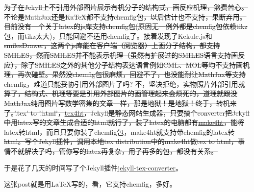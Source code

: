 \documentclass{article}
\begin{document}
\sout{为了在Jekyll上不引用外部图片展示有机分子的结构式，画反应机理，煞费苦心。不论是MathJax还是KaTeX都不支持chemfig包，以后估计也不支持，果断弃用。目前没有一个关于latex的js库支持chemfig包(原因无一例外都是chemfig包依赖tikz包，而tikz太大)，只能回避不适用chemfig了。接着发现了Kekule.js和smilesDrawer，这两个js库能在客户端（阅览器）上画分子结构，都支持SMILES，然而SMILES并不能表示机理（虽然有扩展过的SMILES语言支持画反应），除了SMILES之外的其他分子结构表达语言例如CML、MOL等均不支持画机理，再次碰壁。果然没chemfig包很麻烦，回避不了，也没能耐让MathJax等支持chemfig，难道只能妥协引用外部图片了吗? 不，坚决拒绝，实物照片外部引用就算了，结构式、机理等要是引用外部图片的画管理起来会烦死的，道理就跟没MathJax纯用图片写数学密集的文章一样，那是地狱！是地狱！终于，转机来了。'.tex' to '.html'，\href{https://www.ctan.org/pkg/tex4ht}{tex4ht}，Jekyll是静态网站生成器，只要搞个converter把Jekyll中用latex写的文章生成合适的html就行了，装了latex的电脑都有\href{https://www.ctan.org/pkg/make4ht}{make4ht}，能将latex转html，而且只要你装了chemfig包，make4ht就支持带chemfig的latex转html。写个Jekyll插件，调用本地tex distribution中的make4ht做tex to html，事情不就解决了吗，管你写的latex再复杂，用了再多的包，都没有关系。}

于是花了几天的时间写了个Jekyll插件\href{https://github.com/crow02531/jekyll-tex-converter}{jekyll-tex-converter}。

这张post就是用\LaTeX{}写的，看，它支持chemfig，多好。

\end{document}
